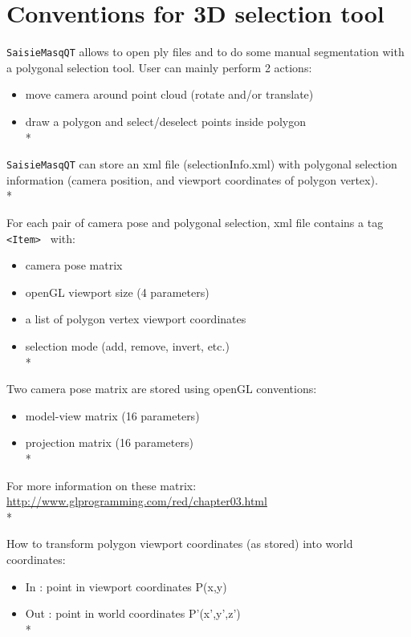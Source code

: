 \section{Conventions for 3D selection tool}
\label{Conv:selection}

{\tt SaisieMasqQT} allows to open ply files and to do some manual segmentation with a polygonal selection tool.
User can mainly perform 2 actions:
\begin{itemize}
\item move camera around point cloud (rotate and/or translate)
\item draw a polygon and select/deselect points inside polygon\\*
\end{itemize}

{\tt SaisieMasqQT} can store an xml file (selectionInfo.xml) with polygonal selection information (camera position, and viewport coordinates of polygon vertex).\\*

For each pair of camera pose and polygonal selection, xml file contains a tag {\tt <Item> } with:
\begin{itemize}
\item camera pose matrix
\item openGL viewport size (4 parameters)
\item a list of polygon vertex viewport coordinates
\item selection mode (add, remove, invert, etc.)\\*
\end{itemize}

Two camera pose matrix are stored using openGL conventions:

\begin{itemize}
\item model-view matrix (16 parameters)
\item projection matrix (16 parameters)\\*
\end{itemize}

For more information on these matrix: \url{http://www.glprogramming.com/red/chapter03.html}\\*

How to transform polygon viewport coordinates (as stored) into world coordinates:

\begin{itemize}
\item In  : point in viewport coordinates P(x,y)
\item Out : point in world coordinates P'(x',y',z')\\*
\end{itemize}

